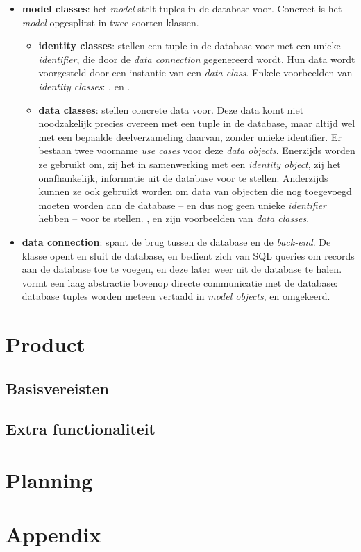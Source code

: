 \documentclass[12pt,a4paper]{article}
\begin{document}
\begin{itemize}

\item \textbf{model classes}: het \emph{model} stelt tuples in de database voor. Concreet is het \emph{model} opgesplitst in twee soorten klassen.

\begin{itemize}

\item \textbf{identity classes}: stellen een tuple in de database voor met een unieke \emph{identifier}, die door de \emph{data connection} gegenereerd wordt. Hun data wordt voorgesteld door een instantie van een \emph{data class}. Enkele voorbeelden van \emph{identity classes}: ,  en .

\item \textbf{data classes}: stellen concrete data voor. Deze data komt niet noodzakelijk precies overeen met een tuple in de database, maar altijd wel met een bepaalde deelverzameling daarvan, zonder unieke identifier. Er bestaan twee voorname \emph{use cases} voor deze \emph{data objects}. Enerzijds worden ze gebruikt om, zij het in samenwerking met een \emph{identity object}, zij het onafhankelijk, informatie uit de database voor te stellen. Anderzijds kunnen ze ook gebruikt worden om data van objecten die nog toegevoegd moeten worden aan de database -- en dus nog geen unieke \emph{identifier} hebben -- voor te stellen. ,  en  zijn voorbeelden van \emph{data classes}.

\end{itemize}

\item \textbf{data connection}: spant de brug tussen de database en de \emph{back-end}. De  klasse opent en sluit de database, en bedient zich van SQL queries om records aan de database toe te voegen, en deze later weer uit de database te halen.  vormt een laag abstractie bovenop directe communicatie met de database: database tuples worden meteen vertaald in \emph{model objects}, en omgekeerd.

\end{itemize}

\section{Product}

\subsection{Basisvereisten}

\subsection{Extra functionaliteit}

\section{Planning}

\section{Appendix}
\end{document}
